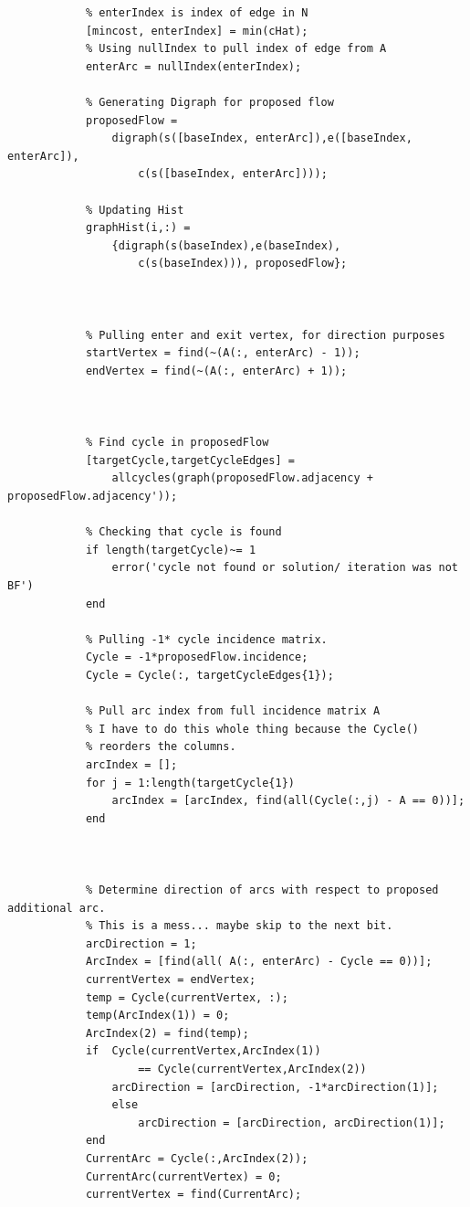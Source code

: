 \documentclass[12pt]{amsart}
\begin{document}
\begin{verbatim}
            % enterIndex is index of edge in N
            [mincost, enterIndex] = min(cHat); 
            % Using nullIndex to pull index of edge from A
            enterArc = nullIndex(enterIndex);
    
            % Generating Digraph for proposed flow
            proposedFlow = 
                digraph(s([baseIndex, enterArc]),e([baseIndex, enterArc]), 
                    c(s([baseIndex, enterArc])));
       
            % Updating Hist
            graphHist(i,:) = 
                {digraph(s(baseIndex),e(baseIndex), 
                    c(s(baseIndex))), proposedFlow};
            
        
    
            % Pulling enter and exit vertex, for direction purposes
            startVertex = find(~(A(:, enterArc) - 1));
            endVertex = find(~(A(:, enterArc) + 1));
    
          
    
            % Find cycle in proposedFlow
            [targetCycle,targetCycleEdges] = 
                allcycles(graph(proposedFlow.adjacency + proposedFlow.adjacency'));
          
            % Checking that cycle is found
            if length(targetCycle)~= 1
                error('cycle not found or solution/ iteration was not BF')
            end
            
            % Pulling -1* cycle incidence matrix. 
            Cycle = -1*proposedFlow.incidence;
            Cycle = Cycle(:, targetCycleEdges{1});
    
            % Pull arc index from full incidence matrix A
            % I have to do this whole thing because the Cycle()
            % reorders the columns. 
            arcIndex = [];
            for j = 1:length(targetCycle{1})
                arcIndex = [arcIndex, find(all(Cycle(:,j) - A == 0))];
            end
    
    
    
            % Determine direction of arcs with respect to proposed additional arc. 
            % This is a mess... maybe skip to the next bit. 
            arcDirection = 1;
            ArcIndex = [find(all( A(:, enterArc) - Cycle == 0))];
            currentVertex = endVertex;
            temp = Cycle(currentVertex, :);
            temp(ArcIndex(1)) = 0;
            ArcIndex(2) = find(temp);
            if  Cycle(currentVertex,ArcIndex(1)) 
                    == Cycle(currentVertex,ArcIndex(2))
                arcDirection = [arcDirection, -1*arcDirection(1)];
                else
                    arcDirection = [arcDirection, arcDirection(1)];
            end
            CurrentArc = Cycle(:,ArcIndex(2));
            CurrentArc(currentVertex) = 0;
            currentVertex = find(CurrentArc);
    

\end{verbatim}
\end{document}
